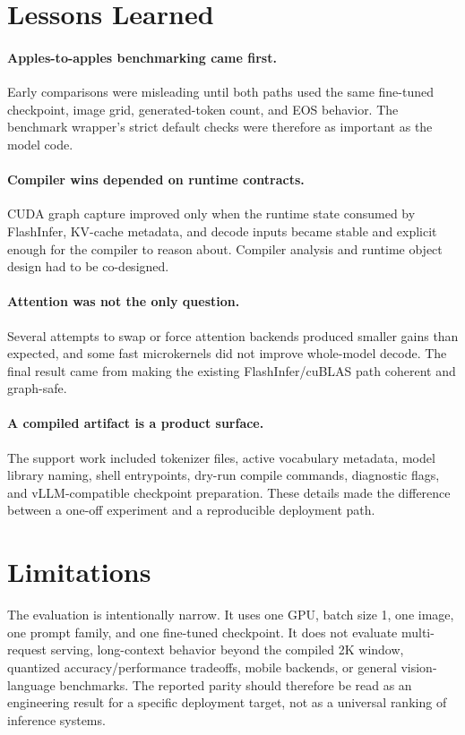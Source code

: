 \documentclass[10pt]{article}
\begin{document}
\section{Lessons Learned}

\paragraph{Apples-to-apples benchmarking came first.}
Early comparisons were misleading until both paths used the same fine-tuned
checkpoint, image grid, generated-token count, and EOS behavior. The benchmark
wrapper's strict default checks were therefore as important as the model code.

\paragraph{Compiler wins depended on runtime contracts.}
CUDA graph capture improved only when the runtime state consumed by FlashInfer,
KV-cache metadata, and decode inputs became stable and explicit enough for the
compiler to reason about. Compiler analysis and runtime object design had to be
co-designed.

\paragraph{Attention was not the only question.}
Several attempts to swap or force attention backends produced smaller gains
than expected, and some fast microkernels did not improve whole-model decode.
The final result came from making the existing FlashInfer/cuBLAS path coherent
and graph-safe.

\paragraph{A compiled artifact is a product surface.}
The support work included tokenizer files, active vocabulary metadata, model
library naming, shell entrypoints, dry-run compile commands, diagnostic flags,
and vLLM-compatible checkpoint preparation. These details made the difference
between a one-off experiment and a reproducible deployment path.

\section{Limitations}

The evaluation is intentionally narrow. It uses one GPU, batch size 1, one
image, one prompt family, and one fine-tuned checkpoint. It does not evaluate
multi-request serving, long-context behavior beyond the compiled 2K window,
quantized accuracy/performance tradeoffs, mobile backends, or general
vision-language benchmarks. The reported parity should therefore be read as an
engineering result for a specific deployment target, not as a universal ranking
of inference systems.
\end{document}
